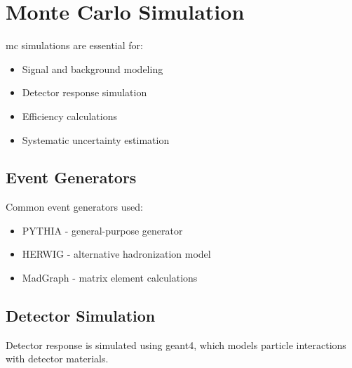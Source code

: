 \section{Monte Carlo Simulation}
\label{sec:EXPERIMENT_MONTE_CARLO_SIMULATION}

\Gls{mc} simulations are essential for:
\begin{itemize}
  \item Signal and background modeling
  \item Detector response simulation
  \item Efficiency calculations
  \item Systematic uncertainty estimation
\end{itemize}

\subsection{Event Generators}
\label{sec:EXPERIMENT_MONTE_CARLO_SIMULATION_EVENT_GENERATORS}

Common event generators used:
\begin{itemize}
  \item PYTHIA - general-purpose generator
  \item HERWIG - alternative hadronization model
  \item MadGraph - matrix element calculations
\end{itemize}

\subsection{Detector Simulation}
\label{sec:EXPERIMENT_MONTE_CARLO_SIMULATION_DETECTOR_SIMULATION}

Detector response is simulated using \gls{geant4}, which models particle interactions with detector materials.

